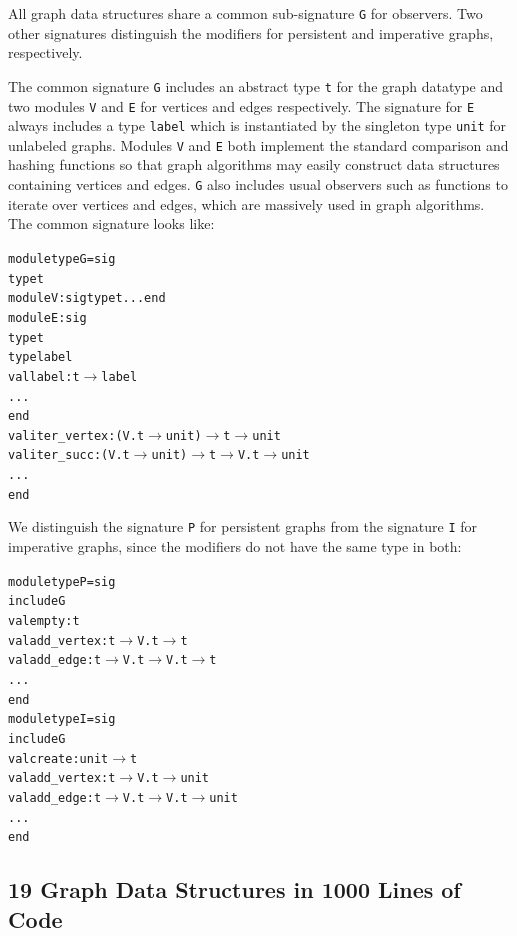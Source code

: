 All graph data structures share a common sub-signature \texttt{G} for
observers. Two other signatures distinguish the modifiers for
persistent and imperative graphs, respectively.

The common signature \texttt{G} includes an abstract type \texttt{t}
for the graph datatype and two modules \texttt{V} and \texttt{E} for
vertices and edges respectively. The signature for \texttt{E} always
includes a type \texttt{label} which is instantiated by the singleton
type \texttt{unit} for unlabeled graphs. Modules \texttt{V} and
\texttt{E} both implement the standard comparison and hashing
functions so that graph algorithms may easily construct data
structures containing vertices and edges.  \texttt{G} also includes
usual observers such as functions to iterate over vertices and edges,
which are massively used in graph algorithms.  The common signature
looks like:

\begin{alltt}
module type G = sig
  type t
  module V : sig type t ... end
  module E : sig
    type t 
    type label 
    val label : t \ensuremath{\rightarrow} label
    ...
  end
  val iter_vertex : (V.t \ensuremath{\rightarrow} unit) \ensuremath{\rightarrow} t \ensuremath{\rightarrow} unit
  val iter_succ : (V.t \ensuremath{\rightarrow} unit) \ensuremath{\rightarrow} t \ensuremath{\rightarrow} V.t \ensuremath{\rightarrow} unit
  ...
end
\end{alltt}
We distinguish the signature \texttt{P} for persistent graphs
from the signature \texttt{I} for imperative graphs, since the modifiers do
not have the same type in both:
\begin{alltt}
module type P = sig
  include G
  val empty : t
  val add_vertex : t \ensuremath{\rightarrow} V.t \ensuremath{\rightarrow} t
  val add_edge : t \ensuremath{\rightarrow} V.t \ensuremath{\rightarrow} V.t \ensuremath{\rightarrow} t
  ...
end
module type I = sig
  include G
  val create : unit \ensuremath{\rightarrow} t
  val add_vertex : t \ensuremath{\rightarrow} V.t \ensuremath{\rightarrow} unit
  val add_edge : t \ensuremath{\rightarrow} V.t \ensuremath{\rightarrow} V.t \ensuremath{\rightarrow} unit
  ...
end
\end{alltt}
\subsection{19 Graph Data Structures in 1000 Lines of Code}\label{XII:structuresdedonnees}

